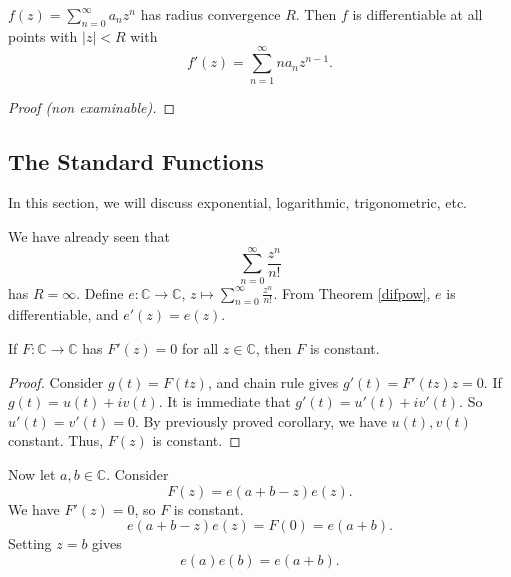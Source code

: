 \leavevmode
\begin{theorem}
    \label{difpow}
    \(f(z) = \sum\limits_{n=0}^{\infty} a_n z^n\) has radius convergence \(R\). Then \(f\) is differentiable at all points with \(\left\vert z \right\vert < R\) with
    \[
        f'(z) = \sum\limits_{n=1}^{\infty} n a_n z^{n - 1}.
    \]
\end{theorem}
\begin{proof}[Proof (non examinable)]
\end{proof}
\subsection{The Standard Functions}
In this section, we will discuss exponential, logarithmic, trigonometric, etc.

We have already seen that
\[
    \sum\limits_{n=0}^{\infty} \frac{z^n}{n!}
\]
has \(R = \infty\). Define \(e: \mathbb{C} \to \mathbb{C}\), \(z \mapsto \sum\limits_{n=0}^{\infty} \frac{z^n}{n!}\). From Theorem \eqref{difpow}, \(e\) is differentiable, and \(e'(z) = e(z)\).

If \(F: \mathbb{C}\to \mathbb{C}\) has \(F'(z) = 0\) for all \(z \in \mathbb{C}\), then \(F\) is constant.
\begin{proof}
    Consider \(g(t) = F(tz)\), and chain rule gives \(g'(t) = F'(tz)z = 0\). If \(g(t) = u(t) + iv(t)\). It is immediate that \(g'(t) = u'(t) + i v'(t)\). So \(u'(t) = v'(t) = 0\). By previously proved corollary, we have \(u(t), v(t)\) constant. Thus, \(F(z)\) is constant.
\end{proof}

Now let \(a, b \in \mathbb{C}\). Consider
\[
    F(z) = e(a + b - z)e(z).
\]
We have \(F'(z) = 0\), so \(F\) is constant.
\[
    e(a + b - z)e(z) = F(0) = e(a + b).
\]
Setting \(z = b\) gives
\[
    e(a)e(b) = e(a + b).
\]